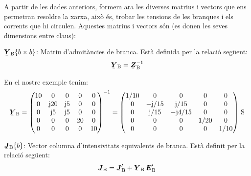 A partir de les dades anteriors, formem ara les diverses matrius i
vectors que ens permetran resoldre la xarxa, aix\`{o} \'{e}s, trobar les
tensions de les branques i els corrents que hi circulen. Aquestes
matrius i vectors s\'{o}n (es donen les seves dimensions entre claus):

\begin{list}{}
{\setlength{\labelwidth}{20mm} \setlength{\leftmargin}{22mm} \setlength{\labelsep}{2mm}}
   \item[$\mcmplx{Y}\ped{B}\{b\times b\}$:] Matriu d'admit\`{a}ncies de branca. Est\`{a} definida per la relaci\'{o} seg\"{u}ent:
   \begin{equation}
      \mcmplx{Y}\ped{B} = \mcmplx{Z}\ped{B}^{-1}
   \end{equation}

   En el nostre exemple tenim:
   \[
      \mcmplx{Y}\ped{B} = \begin{pmatrix}
            10 & 0 & 0 & 0 & 0 \\
            0 & \ju 20 & \ju 5 & 0 & 0 \\
            0 & \ju 5 & \ju 5 & 0 & 0 \\
            0 & 0 & 0 & 20 & 0 \\
            0 & 0 & 0 & 0 & 10
      \end{pmatrix} ^{-1} =
      \begin{pmatrix}
            1/10 & 0 & 0 & 0 & 0 \\
            0 & -\ju/15 & \ju/15 & 0 & 0 \\
            0 & \ju/15 & -\ju 4/15 & 0 & 0 \\
            0 & 0 & 0 & 1/20 & 0 \\
            0 & 0 & 0 & 0 & 1/10
      \end{pmatrix}\unit{S}
   \]

   \item[$\mcmplx{J}\ped{B}\{b\}$:] Vector columna d'intensivitats equivalents de branca. Est\`{a} definit per la relaci\'{o} seg\"{u}ent:
   \begin{equation}
      \mcmplx{J}\ped{B} = \mcmplx{J}'\ped{B}  + \mcmplx{Y}\ped{B} \,\mcmplx{E}'\ped{B}
   \end{equation}


\end{list}
